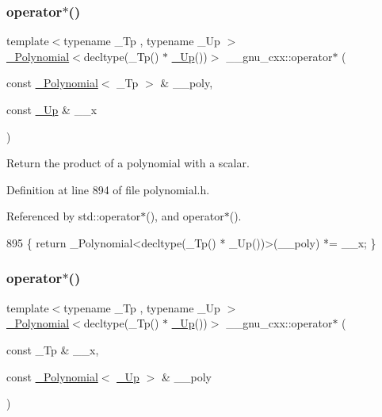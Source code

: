 \subsubsection{\texorpdfstring{operator$\ast$()}{operator*()}\hspace{0.1cm}{\footnotesize\ttfamily [4/6]}}
{\footnotesize\ttfamily template$<$typename \+\_\+\+Tp , typename \+\_\+\+Up $>$ \\
\hyperlink{class____gnu__cxx_1_1__Polynomial}{\+\_\+\+Polynomial}$<$decltype(\+\_\+\+Tp() $\ast$ \hyperlink{namespace____gnu__cxx_ab693ea357b6429b331e0bf09f9442385}{\+\_\+\+Up}())$>$ \+\_\+\+\_\+gnu\+\_\+cxx\+::operator$\ast$ (\begin{DoxyParamCaption}\item[{const \hyperlink{class____gnu__cxx_1_1__Polynomial}{\+\_\+\+Polynomial}$<$ \+\_\+\+Tp $>$ \&}]{\+\_\+\+\_\+poly,  }\item[{const \hyperlink{namespace____gnu__cxx_ab693ea357b6429b331e0bf09f9442385}{\+\_\+\+Up} \&}]{\+\_\+\+\_\+x }\end{DoxyParamCaption})\hspace{0.3cm}{\ttfamily [inline]}}

Return the product of a polynomial with a scalar. 

Definition at line 894 of file polynomial.\+h.



Referenced by std\+::operator$\ast$(), and operator$\ast$().


\begin{DoxyCode}
895     \{ \textcolor{keywordflow}{return} \_Polynomial<decltype(\_Tp() * \_Up())>(\_\_poly) *= \_\_x; \}
\end{DoxyCode}
\mbox{\label{namespace____gnu__cxx_ac79cfe2d37e5d8116fcf51911c21c253}} 
\subsubsection{\texorpdfstring{operator$\ast$()}{operator*()}\hspace{0.1cm}{\footnotesize\ttfamily [5/6]}}
{\footnotesize\ttfamily template$<$typename \+\_\+\+Tp , typename \+\_\+\+Up $>$ \\
\hyperlink{class____gnu__cxx_1_1__Polynomial}{\+\_\+\+Polynomial}$<$decltype(\+\_\+\+Tp() $\ast$ \hyperlink{namespace____gnu__cxx_ab693ea357b6429b331e0bf09f9442385}{\+\_\+\+Up}())$>$ \+\_\+\+\_\+gnu\+\_\+cxx\+::operator$\ast$ (\begin{DoxyParamCaption}\item[{const \+\_\+\+Tp \&}]{\+\_\+\+\_\+x,  }\item[{const \hyperlink{class____gnu__cxx_1_1__Polynomial}{\+\_\+\+Polynomial}$<$ \hyperlink{namespace____gnu__cxx_ab693ea357b6429b331e0bf09f9442385}{\+\_\+\+Up} $>$ \&}]{\+\_\+\+\_\+poly }\end{DoxyParamCaption})\hspace{0.3cm}{\ttfamily [inline]}}



